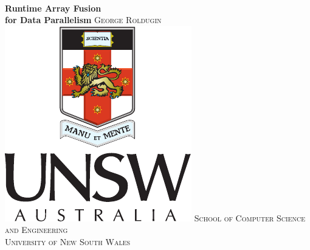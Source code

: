 \documentclass[preamble.tex]{subfiles}
\begin{document}
\begin{titlepage}
    \centering
    ~\\
    \vskip1cm
    \Huge\textbf{Runtime Array Fusion\\for Data Parallelism} 
    \vskip2cm
    \Large\textsc{George Roldugin}
    \vfill
    \vfill
    \includegraphics[scale=1.2]{img/UNSW-Portrait-Colour}
    \vfill
    \Large\textsc{
        School of Computer Science and Engineering\\
        University of New South Wales
    }
    \vfill
    \vfill
\end{titlepage}

\end{document}
